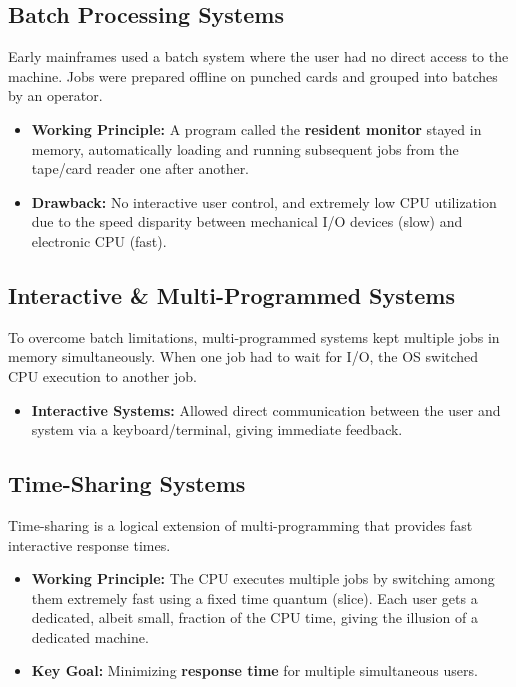\documentclass[12pt,a4paper]{article}
\begin{document}
\subsection{Batch Processing Systems}
Early mainframes used a batch system where the user had no direct access to the machine. Jobs were prepared offline on punched cards and grouped into batches by an operator.
\begin{itemize}[leftmargin=*, itemsep=3pt]
  \item \textbf{Working Principle:} A program called the \textbf{resident monitor} stayed in memory, automatically loading and running subsequent jobs from the tape/card reader one after another.
  \item \textbf{Drawback:} No interactive user control, and extremely low CPU utilization due to the speed disparity between mechanical I/O devices (slow) and electronic CPU (fast).
\end{itemize}

\subsection{Interactive \& Multi-Programmed Systems}
To overcome batch limitations, multi-programmed systems kept multiple jobs in memory simultaneously. When one job had to wait for I/O, the OS switched CPU execution to another job.
\begin{itemize}[leftmargin=*, itemsep=3pt]
  \item \textbf{Interactive Systems:} Allowed direct communication between the user and system via a keyboard/terminal, giving immediate feedback.
\end{itemize}

\subsection{Time-Sharing Systems}
Time-sharing is a logical extension of multi-programming that provides fast interactive response times.
\begin{itemize}[leftmargin=*, itemsep=3pt]
  \item \textbf{Working Principle:} The CPU executes multiple jobs by switching among them extremely fast using a fixed time quantum (slice). Each user gets a dedicated, albeit small, fraction of the CPU time, giving the illusion of a dedicated machine.
  \item \textbf{Key Goal:} Minimizing \textbf{response time} for multiple simultaneous users.
\end{itemize}
\end{document}
